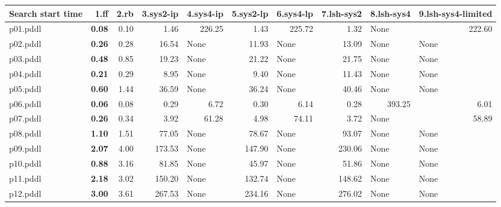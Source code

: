 \documentclass{article}
\begin{document}
\begin{tabular}{@{}lrrrrrrrrr@{}}
Search start time & 1.ff & 2.rb & 3.sys2-ip & 4.sys4-ip & 5.sys2-lp & 6.sys4-lp & 7.lsh-sys2 & 8.lsh-sys4 & 9.lsh-sys4-limited \\
\midrule
p01.pddl & \textbf{0.08} & 0.10 & 1.46 & 226.25 & 1.43 & 225.72 & 1.32 & \multicolumn{1}{|l|}{None} & 222.60 \\
p02.pddl & \textbf{0.26} & 0.28 & 16.54 & \multicolumn{1}{|l|}{None} & 11.93 & \multicolumn{1}{|l|}{None} & 13.09 & \multicolumn{1}{|l|}{None} & \multicolumn{1}{|l|}{None} \\
p03.pddl & \textbf{0.48} & 0.85 & 19.23 & \multicolumn{1}{|l|}{None} & 21.22 & \multicolumn{1}{|l|}{None} & 21.75 & \multicolumn{1}{|l|}{None} & \multicolumn{1}{|l|}{None} \\
p04.pddl & \textbf{0.21} & 0.29 & 8.95 & \multicolumn{1}{|l|}{None} & 9.40 & \multicolumn{1}{|l|}{None} & 11.43 & \multicolumn{1}{|l|}{None} & \multicolumn{1}{|l|}{None} \\
p05.pddl & \textbf{0.60} & 1.44 & 36.59 & \multicolumn{1}{|l|}{None} & 36.24 & \multicolumn{1}{|l|}{None} & 40.46 & \multicolumn{1}{|l|}{None} & \multicolumn{1}{|l|}{None} \\
p06.pddl & \textbf{0.06} & 0.08 & 0.29 & 6.72 & 0.30 & 6.14 & 0.28 & 393.25 & 6.01 \\
p07.pddl & \textbf{0.26} & 0.34 & 3.92 & 61.28 & 4.98 & 74.11 & 3.72 & \multicolumn{1}{|l|}{None} & 58.89 \\
p08.pddl & \textbf{1.10} & 1.51 & 77.05 & \multicolumn{1}{|l|}{None} & 78.67 & \multicolumn{1}{|l|}{None} & 93.07 & \multicolumn{1}{|l|}{None} & \multicolumn{1}{|l|}{None} \\
p09.pddl & \textbf{2.07} & 4.00 & 173.53 & \multicolumn{1}{|l|}{None} & 147.90 & \multicolumn{1}{|l|}{None} & 230.06 & \multicolumn{1}{|l|}{None} & \multicolumn{1}{|l|}{None} \\
p10.pddl & \textbf{0.88} & 3.16 & 81.85 & \multicolumn{1}{|l|}{None} & 45.97 & \multicolumn{1}{|l|}{None} & 51.86 & \multicolumn{1}{|l|}{None} & \multicolumn{1}{|l|}{None} \\
p11.pddl & \textbf{2.18} & 3.02 & 150.20 & \multicolumn{1}{|l|}{None} & 132.74 & \multicolumn{1}{|l|}{None} & 148.62 & \multicolumn{1}{|l|}{None} & \multicolumn{1}{|l|}{None} \\
p12.pddl & \textbf{3.00} & 3.61 & 267.53 & \multicolumn{1}{|l|}{None} & 234.16 & \multicolumn{1}{|l|}{None} & 276.02 & \multicolumn{1}{|l|}{None} & \multicolumn{1}{|l|}{None} \\

\end{tabular}
\end{document}
